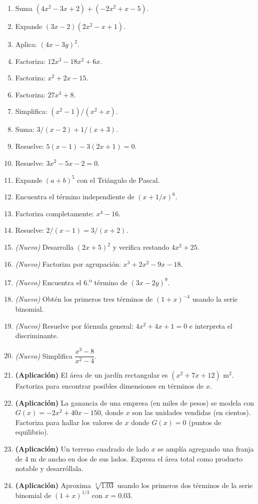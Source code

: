 \documentclass[12pt,letterpaper]{book}
\begin{document}
\begin{enumerate}
\item Suma $(4x^2-3x+2)+(-2x^2+x-5)$.
\item Expande $(3x-2)(2x^2-x+1)$.
\item Aplica: $(4x-3y)^2$.
\item Factoriza: $12x^3-18x^2+6x$.
\item Factoriza: $x^2+2x-15$.
\item Factoriza: $27x^3+8$.
\item Simplifica: $(x^2-1)/(x^2+x)$.
\item Suma: $3/(x-2)+1/(x+3)$.
\item Resuelve: $5(x-1)-3(2x+1)=0$.
\item Resuelve: $3x^2-5x-2=0$.
\item Expande $(a+b)^5$ con el Triángulo de Pascal.
\item Encuentra el término independiente de $(x+1/x)^6$.
\item Factoriza completamente: $x^4-16$.
\item Resuelve: $2/(x-1)=3/(x+2)$.
\item \textit{(Nuevo)} Desarrolla $(2x+5)^2$ y verifica restando $4x^2+25$.
\item \textit{(Nuevo)} Factoriza por agrupación: $x^3+2x^2-9x-18$.
\item \textit{(Nuevo)} Encuentra el 6.\textsuperscript{o} término de $(3x-2y)^9$.
\item \textit{(Nuevo)} Obtén los primeros tres términos de $(1+x)^{-4}$ usando la serie binomial.
\item \textit{(Nuevo)} Resuelve por fórmula general: $4x^2+4x+1=0$ e interpreta el discriminante.
\item \textit{(Nuevo)} Simplifica $\dfrac{x^3-8}{x^2-4}$.
\item \textbf{(Aplicación)} El área de un jardín rectangular es $(x^2+7x+12)$ m$^2$. Factoriza para encontrar posibles dimensiones en términos de $x$.
\item \textbf{(Aplicación)} La ganancia de una empresa (en miles de pesos) se modela con $G(x)=-2x^2+40x-150$, donde $x$ son las unidades vendidas (en cientos). Factoriza para hallar los valores de $x$ donde $G(x)=0$ (puntos de equilibrio).
\item \textbf{(Aplicación)} Un terreno cuadrado de lado $x$ se amplía agregando una franja de 4 m de ancho en dos de sus lados. Expresa el área total como producto notable y desarróllala.
\item \textbf{(Aplicación)} Aproxima $\sqrt[3]{1.03}$ usando los primeros dos términos de la serie binomial de $(1+x)^{1/3}$ con $x=0.03$.
\end{enumerate}
\end{document}
